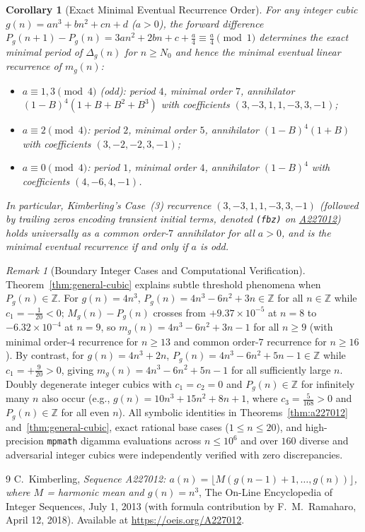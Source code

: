 \documentclass[11pt,a4paper]{article}
\newtheorem{corollary}[theorem]{Corollary}
\theoremstyle{remark}
\newtheorem{remark}[theorem]{Remark}
\begin{document}
\begin{corollary}[Exact Minimal Eventual Recurrence Order]\label{cor:minimal-order}
For any integer cubic $g(n) = an^3 + bn^2 + cn + d$ ($a > 0$), the forward difference $P_g(n+1) - P_g(n) = 3an^2 + 2bn + c + \frac{a}{4} \equiv \frac{a}{4} \pmod{1}$ determines the exact minimal period of $\Delta_g(n)$ for $n \ge N_0$ and hence the minimal eventual linear recurrence of $m_g(n)$:
\begin{itemize}
  \item $a \equiv 1, 3 \pmod{4}$ (odd): period $4$, minimal order $7$, annihilator $(1-B)^4(1+B+B^2+B^3)$ with coefficients $(3, -3, 1, 1, -3, 3, -1)$;
  \item $a \equiv 2 \pmod{4}$: period $2$, minimal order $5$, annihilator $(1-B)^4(1+B)$ with coefficients $(3, -2, -2, 3, -1)$;
  \item $a \equiv 0 \pmod{4}$: period $1$, minimal order $4$, annihilator $(1-B)^4$ with coefficients $(4, -6, 4, -1)$.
\end{itemize}
In particular, Kimberling's Case~(3) recurrence $(3,-3,1,1,-3,3,-1)$ (followed by trailing zeros encoding transient initial terms, denoted \texttt{(fbz)} on \href{https://oeis.org/A227012}{A227012}) holds universally as a common order-$7$ annihilator for all $a > 0$, and is the \emph{minimal} eventual recurrence if and only if $a$ is odd.
\end{corollary}

\begin{remark}[Boundary Integer Cases and Computational Verification]
Theorem~\ref{thm:general-cubic} explains subtle threshold phenomena when $P_g(n) \in \mathbb{Z}$. For $g(n) = 4n^3$, $P_g(n) = 4n^3 - 6n^2 + 3n \in \mathbb{Z}$ for all $n \in \mathbb{Z}$ while $c_1 = -\frac{1}{20} < 0$; $M_g(n) - P_g(n)$ crosses from $+9.37 \times 10^{-5}$ at $n = 8$ to $-6.32 \times 10^{-4}$ at $n = 9$, so $m_g(n) = 4n^3 - 6n^2 + 3n - 1$ for all $n \ge 9$ (with minimal order-$4$ recurrence for $n \ge 13$ and common order-$7$ recurrence for $n \ge 16$). By contrast, for $g(n) = 4n^3 + 2n$, $P_g(n) = 4n^3 - 6n^2 + 5n - 1 \in \mathbb{Z}$ while $c_1 = +\frac{9}{20} > 0$, giving $m_g(n) = 4n^3 - 6n^2 + 5n - 1$ for all sufficiently large $n$. Doubly degenerate integer cubics with $c_1 = c_2 = 0$ and $P_g(n) \in \mathbb{Z}$ for infinitely many $n$ also occur (e.g., $g(n) = 10n^3 + 15n^2 + 8n + 1$, where $c_3 = \frac{5}{168} > 0$ and $P_g(n) \in \mathbb{Z}$ for all even $n$). All symbolic identities in Theorems~\ref{thm:a227012} and~\ref{thm:general-cubic}, exact rational base cases ($1 \le n \le 20$), and high-precision \texttt{mpmath} digamma evaluations across $n \le 10^6$ and over $160$ diverse and adversarial integer cubics were independently verified with zero discrepancies.
\end{remark}

\begin{thebibliography}{9}
C.~Kimberling, \emph{Sequence A227012: $a(n) = \lfloor M(g(n-1)+1, \dots, g(n)) \rfloor$, where $M$ = harmonic mean and $g(n) = n^3$}, The On-Line Encyclopedia of Integer Sequences, July 1, 2013 (with formula contribution by F.~M.~Ramaharo, April 12, 2018). Available at \url{https://oeis.org/A227012}.
\end{thebibliography}
\end{document}
